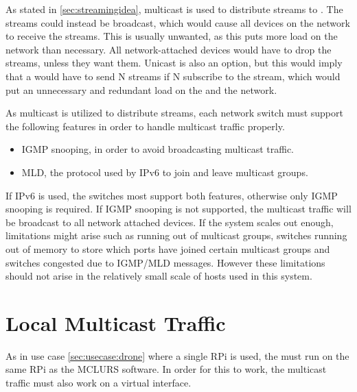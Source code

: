 As stated in \ref{sec:streamingidea}, multicast is used to distribute streams to . The streams could instead be broadcast, which would cause all devices on the network to receive the streams. This is usually unwanted, as this puts more load on the network than necessary. All network-attached devices would have to drop the streams, unless they want them. Unicast is also an option, but this would imply that a  would have to send N streams if N  subscribe to the stream, which would put an unnecessary and redundant load on the  and the network.

As multicast is utilized to distribute streams, each network switch must support the following features in order to handle multicast traffic properly.

\begin{itemize}
	 \item IGMP snooping, in order to avoid broadcasting multicast traffic.
	 \item MLD, the protocol used by IPv6 to join and leave multicast groups.
\end{itemize}
If IPv6 is used, the switches most support both features, otherwise only IGMP snooping is required. If IGMP snooping is not supported, the multicast traffic will be broadcast to all network attached devices.
If the system scales out enough, limitations might arise such as running out of multicast groups, switches running out of memory to store which ports have joined certain multicast groups and switches congested due to IGMP/MLD messages. However these limitations should not arise in the relatively small scale of hosts used in this system. 

\section{Local Multicast Traffic} \label{sec:analysis:localmulticasttrafic}
As in use case \ref{sec:usecase:drone} where a single \ac{RPi} is used, the  must run on the same \ac{RPi} as the \ac{MCLURS} software. In order for this to work, the multicast traffic must also work on  a virtual interface.

